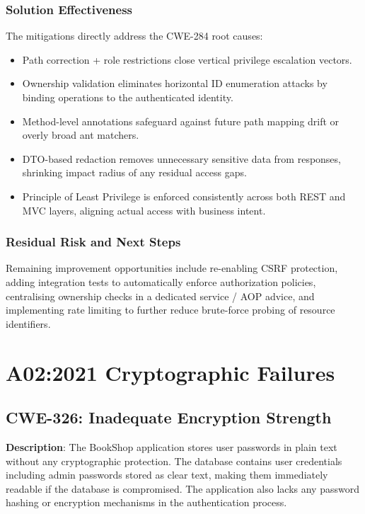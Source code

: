 \documentclass[]{UCD_CS_FYP_Report}
\begin{document}
\subsection*{Solution Effectiveness}
The mitigations directly address the CWE-284 root causes:
\begin{itemize}
	\item Path correction + role restrictions close vertical privilege escalation vectors.
	\item Ownership validation eliminates horizontal ID enumeration attacks by binding operations to the authenticated identity.
	\item Method-level annotations safeguard against future path mapping drift or overly broad ant matchers.
	\item DTO-based redaction removes unnecessary sensitive data from responses, shrinking impact radius of any residual access gaps.
	\item Principle of Least Privilege is enforced consistently across both REST and MVC layers, aligning actual access with business intent.
\end{itemize}

\subsection*{Residual Risk and Next Steps}
Remaining improvement opportunities include re-enabling CSRF protection, adding integration tests to automatically enforce authorization policies, centralising ownership checks in a dedicated service / AOP advice, and implementing rate limiting to further reduce brute-force probing of resource identifiers.




\chapter{A02:2021 Cryptographic Failures}

\section{CWE-326: Inadequate Encryption Strength}

\textbf{Description}: The BookShop application stores user passwords in plain text without any cryptographic protection. The database contains user credentials including admin passwords stored as clear text, making them immediately readable if the database is compromised. The application also lacks any password hashing or encryption mechanisms in the authentication process.
\end{document}
